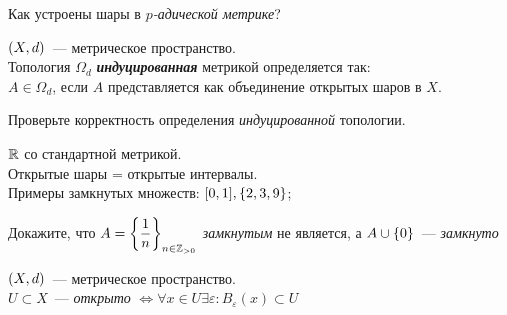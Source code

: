 \documentclass{article}
\begin{document}
    \begin{task_boxed}
        Как устроены шары в \textit{$p$-адической метрике}?
    \end{task_boxed}

    \begin{definition_boxed}
        $\lr*{X, d}$~--- метрическое пространство.\\
        Топология $\Omega_d$ \textbf{\textit{индуцированная}} метрикой определяется так:\\
        $A \in \Omega_d$, если $A$ представляется как объединение открытых шаров в $X$.
    \end{definition_boxed}

    \begin{task_boxed}
        Проверьте корректность определения \textit{индуцированной} топологии.
    \end{task_boxed}

    \begin{example}
        $\R$ со стандартной метрикой.\\
        Открытые шары = открытые интервалы.\\
        Примеры замкнутых множеств: $[0,1], \set*{2, 3, 9}$;
    \end{example}

    \begin{task_boxed}
        Докажите, что $A = \set*{\dfrac{1}{n}}_{n\in \Z_{>0}}$ \textit{замкнутым} не является, а
        $A \cup \set*{0}$~--- \textit{замкнуто}
    \end{task_boxed}


    \begin{task_boxed}
        $\lr*{X, d}$~--- метрическое пространство.\\
        $U \subset X$~--- \textit{открыто} $\Leftrightarrow \forall x \in U \exists \varepsilon: B_{\varepsilon}(x) \subset U$
    \end{task_boxed}
\end{document}
